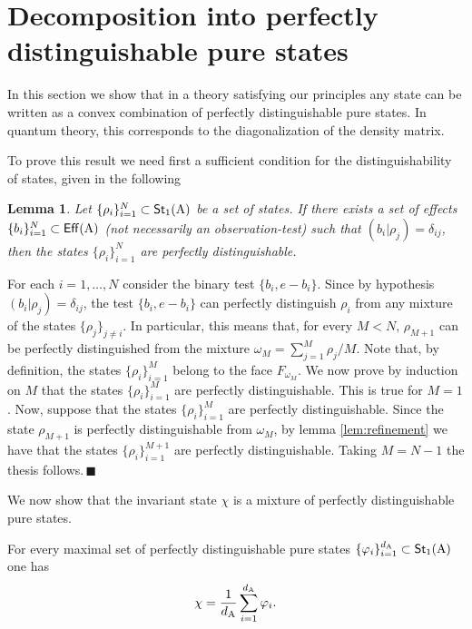 \documentclass[12pt,aps,pra,showpacs,groupedaddress]{revtex4-1}
\newtheorem{lemma}{Lemma} \newtheorem{proposition}{Proposition}
\def\Proof{\medskip\par\noindent{\bf Proof. }}
\def\qed{$\,\blacksquare$\par}
\def\Cntset{{\mathsf{Eff}}}
\def\Stset{{\mathsf{St}}}
\def\SC#1#2{\left(#1\right|\left.\!#2\right)}  \def\Tr{{\rm Tr}}
\begin{document}
\section{Decomposition into perfectly distinguishable pure states}\label{sec:decomposition}
In this section we show that in a theory satisfying our principles any state can be written as a
convex combination of perfectly distinguishable pure states.  In quantum theory, this corresponds to
the diagonalization of the density matrix.


To prove this result we need first a sufficient condition for the distinguishability of states, given in the following
\begin{lemma}
  Let $\{\rho_i\}_{i=1}^N \subset \Stset_1 (\rA)$ be a set of states.  If
  there exists a set of effects $\{b_i\}_{i=1}^N\subset \Cntset(\rA)$ (not necessarily an observation-test) such that
  $(b_i|\rho_j)=\delta_{ij}$, then the states $\{\rho_i\}_{i=1}^N$ are
  perfectly distinguishable.
  \label{lem:setofeffects}
\end{lemma}

\Proof For each $i=1, \dots,N$ consider the binary test $\{b_i, e-b_i\}$.  Since by hypothesis $\SC
{b_i} {\rho_j} = \delta_{ij}$, the test $\{b_i, e-b_i\}$ can perfectly distinguish $\rho_i$ from any
mixture of the states $\{\rho_j\}_{j \not = i}$.  In particular, this means that, for every $M< N$,
$\rho_{M+1}$ can be perfectly distinguished from the mixture $\omega_{M} = \sum_{j=1}^M \rho_j/M$.
Note that, by definition, the states $\{\rho_i\}_{i=1}^M$ belong to the face $F_{\omega_M}$.  We now
prove by induction on $M$ that the states $\{\rho_i\}_{i=1}^{M}$ are perfectly distinguishable. This
is true for $M=1$.  Now, suppose that the states $\{\rho_i\}_{i=1}^{M}$ are perfectly
distinguishable.  Since the state $\rho_{M+1}$ is perfectly distinguishable from $\omega_M$, by
lemma \ref{lem:refinement} we have that the states $\{\rho_i\}_{i=1}^{M+1}$ are perfectly distinguishable. Taking $M=N-1$ the
thesis follows.\qed


We now show that the invariant state $\chi$  is a mixture of perfectly
distinguishable pure states.
\begin{theorem}
  For every maximal set of perfectly distinguishable pure states
  $\{\varphi_i\}_{i=1}^{d_\rA}  \subset \Stset_1 (\rA)$ one has
  \begin{equation*}
    \chi  =   \frac 1 {d_\rA}\sum_{i=1}^{d_\rA}  {\varphi_i}.
  \end{equation*}
  \label{theo:maxdiscrinvar}
\end{theorem}
\end{document}
